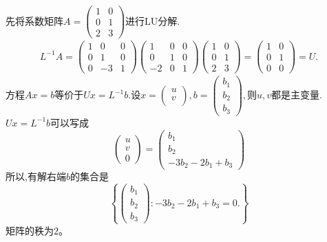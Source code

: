 ﻿\documentclass{book} \usepackage{exsheets} \usepackage{xeCJK}
\begin{document}
\begin{solution}
  先将系数矩阵$A=
  \begin{pmatrix}
    1&0\\
    0&1\\
    2&3
  \end{pmatrix}
  $进行LU分解.
  \begin{align*}
    L^{-1}A=  \begin{pmatrix}
      1&0&0\\
      0&1&0\\
      0&-3&1
    \end{pmatrix}
            \begin{pmatrix}
              1&0&0\\
              0&1&0\\
              -2&0&1
            \end{pmatrix}
                    \begin{pmatrix}
                      1&0\\
                      0&1\\
                      2&3
                    \end{pmatrix}=
                         \begin{pmatrix}
                           1&0\\
                           0&1\\
                           0&0
                         \end{pmatrix}=U.
  \end{align*}
  方程$Ax=b$等价于$Ux=L^{-1}b$.设$x=
  \begin{pmatrix}
    u\\
    v\\
  \end{pmatrix},b=
  \begin{pmatrix}
    b_1\\
    b_2\\
    b_{3}
  \end{pmatrix}, $则$u,v$都是主变量.$Ux=L^{-1}b$可以写成
$$
\begin{pmatrix}
  u\\
  v\\
  0
\end{pmatrix}=
\begin{pmatrix}
  b_{1}\\
  b_{2}\\
  -3b_{2}-2b_{1}+b_{3}
\end{pmatrix}
$$
所以,有解右端$b$的集合是
$$
\left\{
  \begin{pmatrix}
    b_{1}\\
    b_{2}\\
    b_{3}
  \end{pmatrix}:-3b_{2}-2b_{1}+b_{3}=0.  \right\}
$$
矩阵的秩为$2$。
\end{solution}
\end{document}
